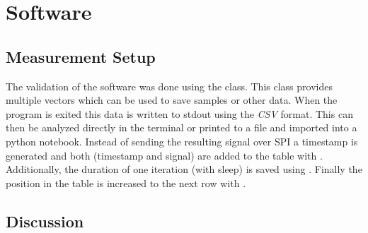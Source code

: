 \section{Software}

\subsection{Measurement Setup}

The validation of the software was done using the  class. This class provides multiple vectors which can be used to save samples or other data. When the program is exited this data is written to stdout using the \textit{CSV} format. This can then be analyzed directly in the terminal or printed to a file and imported into a python notebook.\p
%
Instead of sending the resulting signal over SPI a timestamp is generated and both (timestamp and signal) are added to the table with . Additionally, the duration of one iteration (with sleep) is saved using . Finally the position in the table is increased to the next row with .

\subsection{Discussion}

